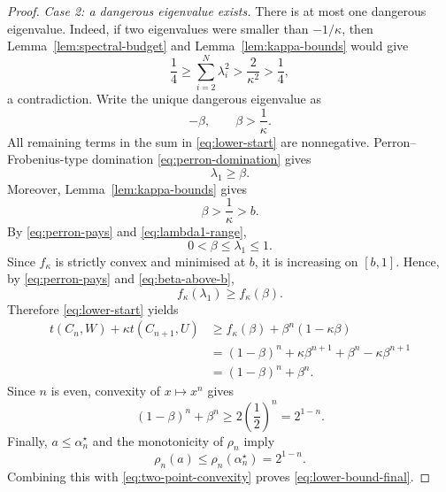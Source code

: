 \documentclass[11pt]{article}
\theoremstyle{definition}
\theoremstyle{remark}
\begin{document}
\begin{proof}
  \medskip
  \noindent\emph{Case 2: a dangerous eigenvalue exists.}
  There is at most one dangerous eigenvalue.  Indeed, if two eigenvalues were
  smaller than $-1/\kappa$, then Lemma~\ref{lem:spectral-budget} and
  Lemma~\ref{lem:kappa-bounds} would give
  \[
    \frac14
    \ge\sum_{i=2}^N\lambda_i^2
    >\frac{2}{\kappa^2}
    >\frac14,
  \]
  a contradiction.  Write the unique dangerous eigenvalue as
  \[
    -\beta,
    \qquad
    \beta>\frac1\kappa.
  \]
  All remaining terms in the sum in \eqref{eq:lower-start} are nonnegative.
  Perron--Frobenius-type domination \eqref{eq:perron-domination} gives
  \begin{equation}
    \lambda_1\ge\beta.
    \label{eq:perron-pays}
  \end{equation}
  Moreover, Lemma~\ref{lem:kappa-bounds} gives
  \begin{equation}
    \beta>\frac1\kappa>b.
    \label{eq:beta-above-b}
  \end{equation}
  By \eqref{eq:perron-pays} and \eqref{eq:lambda1-range},
  \[
    0<\beta\le\lambda_1\le1.
  \]
  Since $f_\kappa$ is strictly convex and minimised at $b$, it is increasing
  on $[b,1]$.  Hence, by \eqref{eq:perron-pays} and
  \eqref{eq:beta-above-b},
  \[
    f_\kappa(\lambda_1)\ge f_\kappa(\beta).
  \]
  Therefore \eqref{eq:lower-start} yields
  \begin{align*}
    t(C_n,W)+\kappa t(C_{n+1},U)
    &\ge
    f_\kappa(\beta)+\beta^n(1-\kappa\beta)\\
    &=
    (1-\beta)^n+\kappa\beta^{n+1}
    +\beta^n-\kappa\beta^{n+1}\\
    &=
    (1-\beta)^n+\beta^n.
  \end{align*}
  Since $n$ is even, convexity of $x\mapsto x^n$ gives
  \begin{equation}
    (1-\beta)^n+\beta^n
    \ge2\left(\frac12\right)^n
    =2^{1-n}.
    \label{eq:two-point-convexity}
  \end{equation}
  Finally, $a\le\alpha_n^\star$ and the monotonicity of $\rho_n$ imply
  \[
    \rho_n(a)\le\rho_n(\alpha_n^\star)=2^{1-n}.
  \]
  Combining this with \eqref{eq:two-point-convexity} proves
  \eqref{eq:lower-bound-final}.
\end{proof}
\end{document}
